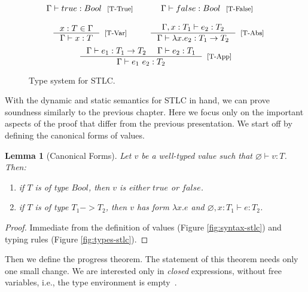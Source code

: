\documentclass[tese,capa,english]{texufpel}
\newtheorem{lemma}{Lemma}
\begin{document}
\begin{figure}[!htb]
\[
\begin{array}{ccc}
    \Gamma \vdash true : Bool \ \ \footnotesize\textrm{[T-True]}
  & &
    \Gamma \vdash false : Bool \ \ \footnotesize\textrm{[T-False]}
\\ \\  
  \inference{x : T \in \Gamma}
            {\Gamma \vdash x : T}[\textrm{[T-Var]}]
& &
  \inference{\Gamma , x : T_1 \vdash e_2 : T_2}
            {\Gamma \vdash \lambda x . e_2 : T_1 -> T_2}[\textrm{[T-Abs]}]
\end{array}    
\]
\vspace{3pt}
\[
\begin{array}{ccc}
&
\inference{\Gamma \vdash e_1 : T_{1} -> T_{2} \ \ \ \ \Gamma \vdash e_2 : T_{1}}
          {\Gamma \vdash e_1 ~ e_2 : T_{2}}[\textrm{[T-App]}]
&
\end{array}    
\]
\caption{Type system for STLC.}
\label{fig:typing-stlc}
\end{figure}

With the dynamic and static semantics for STLC in hand, we can prove soundness similarly to the previous chapter. Here we focus only on the important aspects of the proof that differ from the previous presentation. We start off by defining the canonical forms of values.

\begin{lemma}[Canonical Forms]
\label{lem:canexp}
Let $v$ be a well-typed value such that $\varnothing \vdash v : T$. Then: \\
\begin{enumerate}
\vspace{-4ex}
\item if $T$ is of type $Bool$, then $v$ is either $true$ or $false$. \\
\vspace{-4ex}
\item if $T$ is of type $T_1 -> T_2$, then $v$ has form $\lambda x . e$ and $\varnothing , x : T_1 \vdash e : T_2$.
\end{enumerate}
\end{lemma}

\begin{proof}
Immediate from the definition of values (Figure \ref{fig:syntax-stlc}) and typing rules (Figure \ref{fig:types-stlc}).
\end{proof}

\pagebreak

Then we define the progress theorem. The statement of this theorem needs only one small change. We are interested only in \emph{closed} expressions, without free variables, i.e., the type environment is empty~\cite{Pierce:2002:TPL:509043}.
\end{document}
